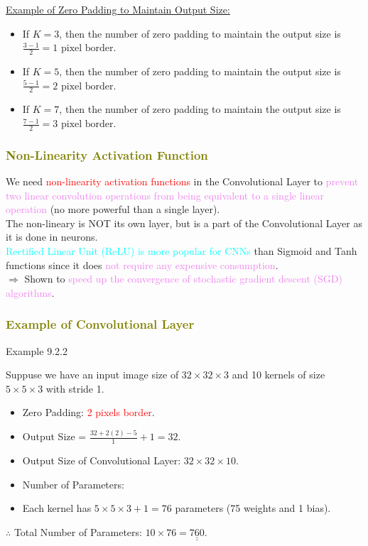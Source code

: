 \documentclass{book}
\begin{document}
\uline{Example of Zero Padding to Maintain Output Size:}\\
\begin{itemize}
    \item If \(K = 3\), then the number of zero padding to maintain the output size is \(\frac{3 - 1}{2} = 1 \text{ pixel border}\).
    \item If \(K = 5\), then the number of zero padding to maintain the output size is \(\frac{5 - 1}{2} = 2 \text{ pixel border}\).
    \item If \(K = 7\), then the number of zero padding to maintain the output size is \(\frac{7 - 1}{2} = 3 \text{ pixel border}\).
\end{itemize}
\textcolor{olive}{\subsubsection{Non-Linearity Activation Function}}
We need \textcolor{red}{non-linearity activation functions} in the Convolutional Layer to \textcolor{violet}{prevent two linear convolution operations from being equivalent to a single linear operation} (no more powerful than a single layer).\\
The non-lineary is NOT its own layer, but is a part of the Convolutional Layer as it is done in neurons.\\
\textcolor{cyan}{Rectified Linear Unit (ReLU) is more popular for CNNs} than Sigmoid and Tanh functions since it does \textcolor{violet}{not require any expensive consumption}.\\
$\Rightarrow$ Shown to \textcolor{violet}{speed up the convergence of stochastic gradient descent (SGD) algorithms}.\\
\textcolor{olive}{\subsubsection{Example of Convolutional Layer}}
\begin{egBox}{Example 9.2.2}{}
    \raggedright
    Suppuse we have an input image size of $32 \times 32 \times 3$ and 10 kernels of size $5 \times 5 \times 3$ with stride 1.\\
    \begin{itemize}
        \item Zero Padding: \textcolor{red}{2 pixels border}.
        \item Output Size = $\frac{32 + 2(2) - 5}{1} + 1 = 32$.
        \item Output Size of Convolutional Layer: $32 \times 32 \times 10$.
        \item Number of Parameters:
        \item Each kernel has $5 \times 5 \times 3 + 1 = 76$ parameters (75 weights and 1 bias).
    \end{itemize}
    $\therefore$ Total Number of Parameters: $10 \times 76 = \underline{\underline{760}}$.
\end{egBox}
\end{document}
